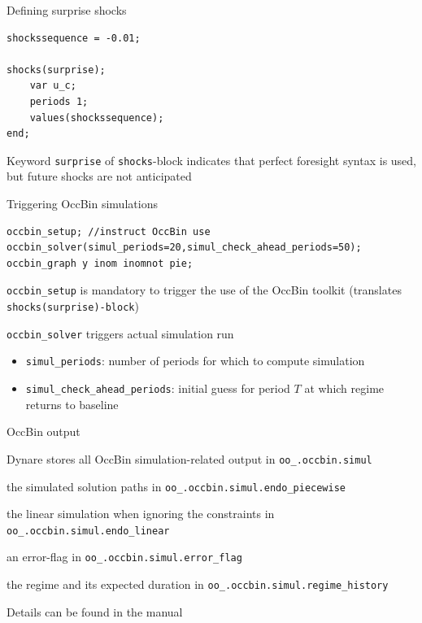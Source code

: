 \begin{frame}[fragile]{Defining surprise shocks}
\begin{verbatim}
shockssequence = -0.01;

shocks(surprise);
    var u_c;
    periods 1;
    values(shockssequence);
end;
\end{verbatim}
\begin{wideitemize}
  \item Keyword \texttt{surprise} of \texttt{shocks}-block indicates that perfect foresight syntax is used, but future shocks are not anticipated
\end{wideitemize}
\end{frame}

\begin{frame}[fragile]{Triggering OccBin simulations}
\begin{verbatim}
occbin_setup; //instruct OccBin use
occbin_solver(simul_periods=20,simul_check_ahead_periods=50);
occbin_graph y inom inomnot pie;
\end{verbatim}
\begin{wideitemize}
  \item \texttt{occbin\_setup} is mandatory to trigger the use of the OccBin toolkit (translates\\ \texttt{shocks(surprise)-block})
  \item \texttt{occbin\_solver} triggers actual simulation run
  \begin{itemize}
    \item \texttt{simul\_periods}: number of periods for which to compute simulation
    \item \texttt{simul\_check\_ahead\_periods}: initial guess for period $T$ at which regime returns to baseline
  \end{itemize}
\end{wideitemize}
\end{frame}

\begin{frame}{OccBin output}
\begin{wideitemize}
\item Dynare stores all OccBin simulation-related output in \texttt{oo\_.occbin.simul}
\begin{wideitemize}
  \item the simulated solution paths in \texttt{oo\_.occbin.simul.endo\_piecewise}
  \item the linear simulation when ignoring the constraints in \texttt{oo\_.occbin.simul.endo\_linear}
  \item an error-flag in \texttt{oo\_.occbin.simul.error\_flag}
  \item the regime and its expected duration in \texttt{oo\_.occbin.simul.regime\_history}
\end{wideitemize}
\item Details can be found in the manual
\end{wideitemize}
\end{frame}

